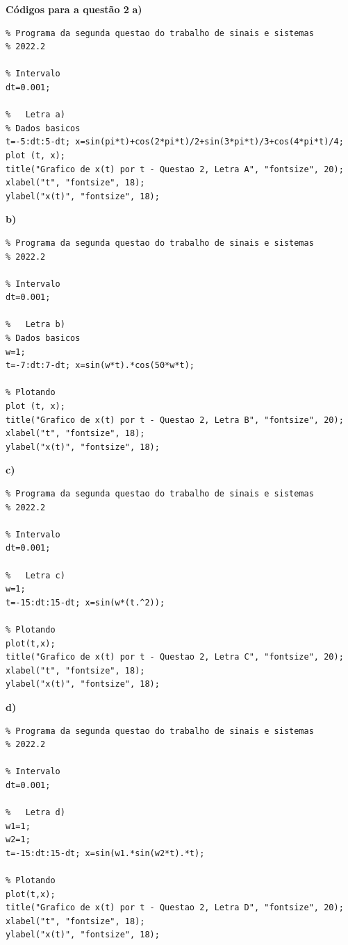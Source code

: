 \documentclass{article}
\begin{document}
\vspace{\baselineskip}

{\textbf{Códigos para a questão 2}}
\textbf{a)}
\begin{verbatim}
% Programa da segunda questao do trabalho de sinais e sistemas
% 2022.2

% Intervalo
dt=0.001;

%   Letra a)
% Dados basicos
t=-5:dt:5-dt; x=sin(pi*t)+cos(2*pi*t)/2+sin(3*pi*t)/3+cos(4*pi*t)/4;
plot (t, x);
title("Grafico de x(t) por t - Questao 2, Letra A", "fontsize", 20);
xlabel("t", "fontsize", 18);
ylabel("x(t)", "fontsize", 18);
\end{verbatim}

\noindent \textbf{b)}
\begin{verbatim}
% Programa da segunda questao do trabalho de sinais e sistemas
% 2022.2

% Intervalo
dt=0.001;

%   Letra b)
% Dados basicos
w=1;
t=-7:dt:7-dt; x=sin(w*t).*cos(50*w*t);

% Plotando
plot (t, x);
title("Grafico de x(t) por t - Questao 2, Letra B", "fontsize", 20);
xlabel("t", "fontsize", 18);
ylabel("x(t)", "fontsize", 18);
\end{verbatim}

\noindent \textbf{c)}
\begin{verbatim}
% Programa da segunda questao do trabalho de sinais e sistemas
% 2022.2

% Intervalo
dt=0.001;

%   Letra c)
w=1;
t=-15:dt:15-dt; x=sin(w*(t.^2));

% Plotando
plot(t,x);
title("Grafico de x(t) por t - Questao 2, Letra C", "fontsize", 20);
xlabel("t", "fontsize", 18);
ylabel("x(t)", "fontsize", 18);
\end{verbatim}

\noindent \textbf{d)}
\begin{verbatim}
% Programa da segunda questao do trabalho de sinais e sistemas
% 2022.2

% Intervalo
dt=0.001;

%   Letra d)
w1=1;
w2=1;
t=-15:dt:15-dt; x=sin(w1.*sin(w2*t).*t);

% Plotando
plot(t,x);
title("Grafico de x(t) por t - Questao 2, Letra D", "fontsize", 20);
xlabel("t", "fontsize", 18);
ylabel("x(t)", "fontsize", 18);
\end{verbatim}

\vspace{\baselineskip}
\end{document}
